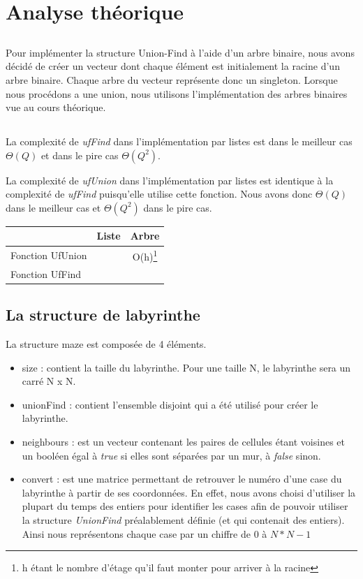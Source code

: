 
\usepackage{clrscode3e}





\section{Analyse théorique}
\subsection{} %
	Pour implémenter la structure Union-Find à l'aide d'un arbre binaire, nous avons décidé de créer un vecteur dont chaque élément est initialement la racine d'un arbre binaire. Chaque arbre du vecteur représente donc un singleton. Lorsque nous procédons a une union, nous utilisons l'implémentation des arbres binaires vue au cours théorique.

\subsection{} %
La complexité de \textit{ufFind} dans l'implémentation par listes est dans le meilleur cas $\Theta(Q)$ et dans le pire cas $\Theta(Q^2)$.

La complexité de \textit{ufUnion} dans l'implémentation par listes est identique à la complexité de \textit{ufFind} puisqu'elle utilise cette fonction. Nous avons donc $\Theta(Q)$ dans le meilleur cas et $\Theta(Q^2)$ dans le pire cas.

	\begin{tabular}{|l||c|c|}
	\hline
  & Liste & Arbre\\
  \hline\hline
  Fonction UfUnion & & O(h)\footnote{h étant le nombre d'étage qu'il faut monter pour arriver à la racine} \\
  Fonction UfFind & & \\
  \hline
\end{tabular}

\subsection{La structure de labyrinthe} %
La structure maze est composée de 4 éléments.
\begin{itemize}
\item size : contient la taille du labyrinthe. Pour une taille N, le labyrinthe sera un carré N x N.
\item unionFind : contient l'ensemble disjoint qui a été utilisé pour créer le labyrinthe.
\item neighbours : est un vecteur contenant les paires de cellules étant voisines et un booléen égal à \textit{true} si elles sont séparées par un mur, à \textit{false} sinon.
\item convert : est une matrice permettant de retrouver le numéro d'une case du labyrinthe à partir de ses coordonnées.
\bigbreak
En effet, nous avons choisi d'utiliser la plupart du temps des entiers pour identifier les cases afin de pouvoir utiliser la structure \textit{UnionFind} préalablement définie (et qui contenait des entiers). Ainsi nous représentons chaque case par un chiffre de $0$ à $N *N - 1$
\end{itemize}

